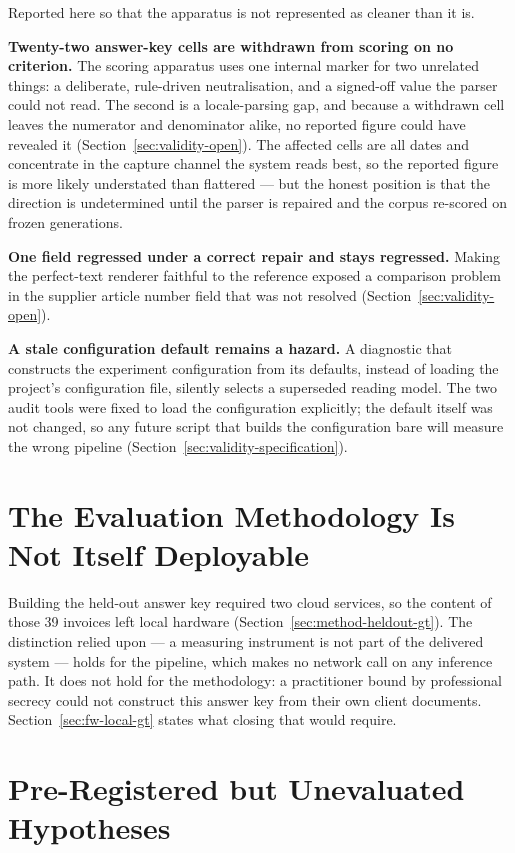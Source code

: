 Reported here so that the apparatus is not represented as cleaner than it is.

\textbf{Twenty-two answer-key cells are withdrawn from scoring on no criterion.} The scoring
apparatus uses one internal marker for two unrelated things: a deliberate, rule-driven
neutralisation, and a signed-off value the parser could not read. The second is a locale-parsing
gap, and because a withdrawn cell leaves the numerator and denominator alike, no reported figure
could have revealed it (Section~\ref{sec:validity-open}). The affected cells are all dates and
concentrate in the capture channel the system reads best, so the reported figure is more likely
understated than flattered --- but the honest position is that the direction is undetermined
until the parser is repaired and the corpus re-scored on frozen generations.

\textbf{One field regressed under a correct repair and stays regressed.} Making the
perfect-text renderer faithful to the reference exposed a comparison problem in the supplier
article number field that was not resolved (Section~\ref{sec:validity-open}).

\textbf{A stale configuration default remains a hazard.} A diagnostic that constructs the
experiment configuration from its defaults, instead of loading the project's configuration file,
silently selects a superseded reading model. The two audit tools were fixed to load the
configuration explicitly; the default itself was not changed, so any future script that builds
the configuration bare will measure the wrong pipeline (Section~\ref{sec:validity-specification}).

\section{The Evaluation Methodology Is Not Itself Deployable}
\label{sec:lim-cloud-gt}

Building the held-out answer key required two cloud services, so the content of those 39 invoices
left local hardware (Section~\ref{sec:method-heldout-gt}). The distinction relied upon --- a measuring
instrument is not part of the delivered system --- holds for the pipeline, which makes no network
call on any inference path. It does not hold for the methodology: a practitioner bound by
professional secrecy could not construct this answer key from their own client documents.
Section~\ref{sec:fw-local-gt} states what closing that would require.

\section{Pre-Registered but Unevaluated Hypotheses}
\label{sec:unevaluated}

